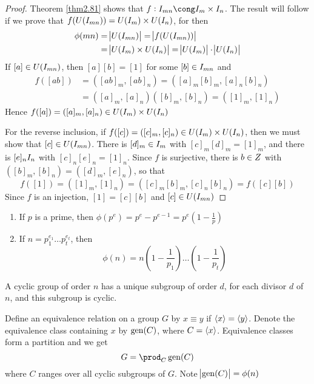 \documentclass[11pt]{article}
\begin{document}
\begin{proof}
Theorem \ref{thm2.81} shows that \(f:\I_{mn}\cong\I_m\times\I_n\). The result will
follow if we prove that \(f(U(\relax{I}_{mn}))=U(\relax{I}_m)\times U(\relax{I}_n)\), for then
\begin{align*}
\phi(mn)&=\abs{U(\relax{I}_{mn})}=\abs{f(U(\relax{I}_{mn}))}\\
&=\abs{U(\relax{I}_m)\times U(\relax{I}_n)}=\abs{U(\relax{I}_m)}\cdot\abs{U(\relax{I}_n)}
\end{align*}
If \([a]\in U(\relax{I}_{mn})\), then \([a][b]=[1]\) for some \([b]\in\relax{I}_{mn}\) and
\begin{align*}
f([ab])&=([ab]_m,[ab]_n)=([a]_m[b]_m,[a]_n[b]_n)\\
&=([a]_m,[a]_n)([b]_m,[b]_n)=([1]_m,[1]_n)
\end{align*}
Hence \(f([a])=([a]_m,[a]_n)\in U(\relax{I}_m)\times U(\relax{I}_n)\)

For the reverse inclusion, if \(f([c])=([c]_m,[c]_n)\in U(\relax{I}_m)\times
   U(\relax{I}_n)\), then we must show that \([c]\in U(\relax{I}_{mn})\). There is \([d]_m\in\relax{I}_m\)
with \([c]_m[d]_m=[1]_m\), and there is \([e]_n\relax{I}_n\) with \([c]_n[e]_n=[1]_n\).
Since \(f\) is surjective, there is \(b\in\relax{Z}\) with
\(([b]_m,[b]_n)=([d]_m,[e]_n)\), so that
\begin{equation*}
f([1])=([1]_m,[1]_n)=([c]_m[b]_m,[c]_n[b]_n)=f([c][b])
\end{equation*}
Since \(f\) is an injection, \([1]=[c][b]\) and \([c]\in U(\relax{I}_{mn})\)
\end{proof}

\begin{corollary}[]
\begin{enumerate}
\item If \(p\) is a prime, then \(\phi(p^e)=p^e-p^{e-1}=p^e(1-\frac{1}{p})\)
\item If \(n=p_1^{e_1}\dots p_t^{e_t}\), then
\begin{equation*}
\phi(n)=n(1-\frac{1}{p_1})\dots(1-\frac{1}{p_t})
\end{equation*}
\end{enumerate}
\end{corollary}

\begin{lemma}[]
\label{nlemma1.92}
A cyclic group of order \(n\) has a unique subgroup of order \(d\), for each
divisor \(d\) of \(n\), and this subgroup is cyclic.
\end{lemma}

Define an equivalence relation on a group \(G\) by \(x\equiv y\) if \(\langle x\rangle=\langle
   y\rangle\). Denote the equivalence class containing \(x\) by \(\operatorname{gen}(C)\), where \(C=\langle
   x\rangle\). Equivalence classes form a partition and we get
\begin{equation*}
G=\displaystyle\prod_{C}\gen(C)
\end{equation*}
where \(C\) ranges over all cyclic subgroups of \(G\). Note \(\abs{\operatorname{gen}(C)}=\phi(n)\)
\end{document}
